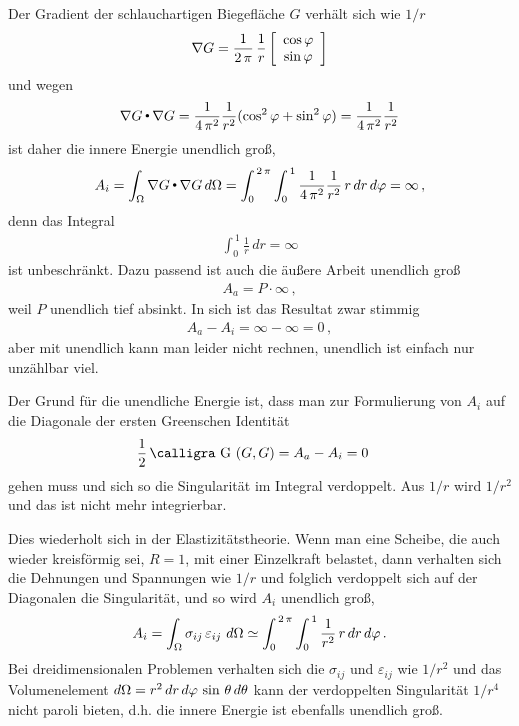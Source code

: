 {{{{{Der Gradient der schlauchartigen Biegefl\"{a}che $G$ verh\"{a}lt sich wie $1/r$
\begin{align}
\nabla G = \frac{1}{2\,\pi}\,\frac{1}{r} \left[ \barr {c }
      \cos \Np  \\
      \sin \Np
     \earr \right]
\end{align}
und wegen
\begin{align}
\nabla G \dotprod  \nabla G = \frac{1}{4\,\pi^2}\frac{1}{r^2} (\cos^2 \Np + \sin^2 \Np) = \frac{1}{4\,\pi^2}\frac{1}{r^2}
\end{align}
ist daher die innere Energie unendlich gro{\ss},
\begin{align}
A_i = \int_{\Omega} \nabla G \dotprod \nabla G \,d\Omega = \int_0^{\,2\,\pi} \int_0^{\,1} \frac{1}{4\,\pi^2}\frac{1}{r^2}\,r\,dr\,d\Np = \infty\,,
\end{align}
denn das Integral
\begin{align}
\int_0^{\,1} \frac{1}{r}\,dr = \infty
\end{align}
ist unbeschr\"{a}nkt. Dazu passend ist auch die \"{a}u{\ss}ere Arbeit unendlich gro{\ss}
\begin{align}
A_a = P \cdot \infty\,,
\end{align}
weil $P$ unendlich tief absinkt. In sich ist das Resultat zwar stimmig
\begin{align}
A_a - A_i = \infty - \infty = 0\,,
\end{align}
aber mit unendlich kann man leider nicht rechnen, unendlich ist einfach nur \glq unz\"{a}hlbar viel\grq{}.

Der Grund f\"{u}r die unendliche Energie ist, dass man zur Formulierung von $A_i$ auf die Diagonale
der ersten Greenschen Identit\"{a}t
\begin{align}
\frac{1}{2}\, \text{\normalfont\calligra G\,\,}(G, G) &= A_a - A_i = 0
\end{align}
gehen muss und sich so die Singularit\"{a}t im Integral verdoppelt. Aus $1/r$ wird $1/r^2$ und das ist nicht mehr integrierbar.

Dies wiederholt sich in der Elastizit\"{a}tstheorie. Wenn man eine Scheibe, die auch wieder kreisf\"{o}rmig sei, $R = 1$, mit einer Einzelkraft belastet, dann verhalten sich die Dehnungen und Spannungen wie $1/r$ und folglich verdoppelt sich auf der Diagonalen die Singularit\"{a}t, und so wird $A_i$ unendlich gro{\ss},
\begin{align}
A_i = \int_{\Omega} \sigma_{ij}\,\varepsilon_{ij}\,\,d\Omega \simeq \int_0^{\,2\,\pi} \int_0^{\,1} \frac{1}{r^2}\,r\,dr\,d\Np\,.
\end{align}
Bei dreidimensionalen Problemen verhalten sich die $\sigma_{ij}$ und $\varepsilon_{ij}$ wie $1/r^2$ und das Volumenelement $d\Omega = r^2\,dr\,d\Np\,\sin\,\theta\,d\theta$ kann der verdoppelten Singularit\"{a}t $1/r^4$ nicht paroli bieten, d.h. die innere Energie ist ebenfalls unendlich gro{\ss}.

}}}}}
